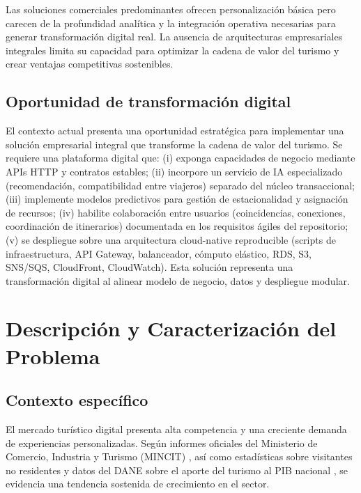 \documentclass[12pt, letterpaper]{article}
\begin{document}
Las soluciones comerciales predominantes ofrecen personalización básica pero carecen de la profundidad analítica y la integración operativa necesarias para generar transformación digital real. La ausencia de arquitecturas empresariales integrales limita su capacidad para optimizar la cadena de valor del turismo y crear ventajas competitivas sostenibles.

\subsection*{Oportunidad de transformación digital}

El contexto actual presenta una oportunidad estratégica para implementar una solución empresarial integral que transforme la cadena de valor del turismo. Se requiere una plataforma digital que: (i) exponga capacidades de negocio mediante APIs HTTP y contratos estables; (ii) incorpore un servicio de IA especializado (recomendación, compatibilidad entre viajeros) separado del núcleo transaccional; (iii) implemente modelos predictivos para gestión de estacionalidad y asignación de recursos; (iv) habilite colaboración entre usuarios (coincidencias, conexiones, coordinación de itinerarios) documentada en los requisitos ágiles del repositorio; (v) se despliegue sobre una arquitectura cloud-native reproducible (scripts de infraestructura, API Gateway, balanceador, cómputo elástico, RDS, S3, SNS/SQS, CloudFront, CloudWatch). Esta solución representa una transformación digital al alinear modelo de negocio, datos y despliegue modular.

\section{Descripción y Caracterización del Problema}

\subsection{Contexto específico}

El mercado turístico digital presenta alta competencia y una creciente demanda de experiencias personalizadas. Según informes oficiales del Ministerio de Comercio, Industria y Turismo (MINCIT) \citep{ref3}, así como estadísticas sobre visitantes no residentes \citep{ref4} y datos del DANE sobre el aporte del turismo al PIB nacional \citep{ref5}, se evidencia una tendencia sostenida de crecimiento en el sector.
\end{document}
